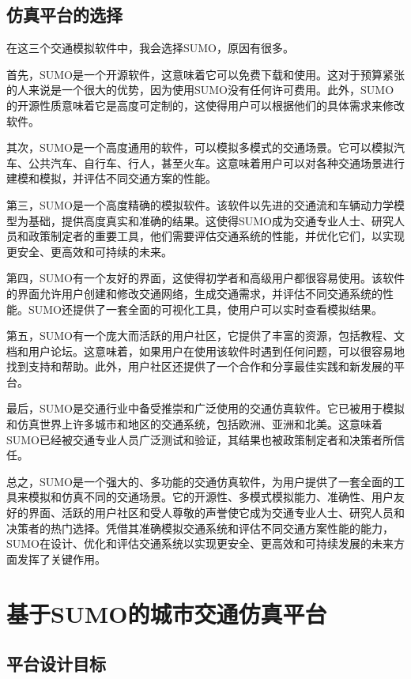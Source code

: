 \subsection{仿真平台的选择}

在这三个交通模拟软件中，我会选择SUMO，原因有很多。

首先，SUMO是一个开源软件，这意味着它可以免费下载和使用。这对于预算紧张的人来说是一个很大的优势，因为使用SUMO没有任何许可费用。此外，SUMO的开源性质意味着它是高度可定制的，这使得用户可以根据他们的具体需求来修改软件。

其次，SUMO是一个高度通用的软件，可以模拟多模式的交通场景。它可以模拟汽车、公共汽车、自行车、行人，甚至火车。这意味着用户可以对各种交通场景进行建模和模拟，并评估不同交通方案的性能。

第三，SUMO是一个高度精确的模拟软件。该软件以先进的交通流和车辆动力学模型为基础，提供高度真实和准确的结果。这使得SUMO成为交通专业人士、研究人员和政策制定者的重要工具，他们需要评估交通系统的性能，并优化它们，以实现更安全、更高效和可持续的未来。

第四，SUMO有一个友好的界面，这使得初学者和高级用户都很容易使用。该软件的界面允许用户创建和修改交通网络，生成交通需求，并评估不同交通系统的性能。SUMO还提供了一套全面的可视化工具，使用户可以实时查看模拟结果。

第五，SUMO有一个庞大而活跃的用户社区，它提供了丰富的资源，包括教程、文档和用户论坛。这意味着，如果用户在使用该软件时遇到任何问题，可以很容易地找到支持和帮助。此外，用户社区还提供了一个合作和分享最佳实践和新发展的平台。

最后，SUMO是交通行业中备受推崇和广泛使用的交通仿真软件。它已被用于模拟和仿真世界上许多城市和地区的交通系统，包括欧洲、亚洲和北美。这意味着SUMO已经被交通专业人员广泛测试和验证，其结果也被政策制定者和决策者所信任。

总之，SUMO是一个强大的、多功能的交通仿真软件，为用户提供了一套全面的工具来模拟和仿真不同的交通场景。它的开源性、多模式模拟能力、准确性、用户友好的界面、活跃的用户社区和受人尊敬的声誉使它成为交通专业人士、研究人员和决策者的热门选择。凭借其准确模拟交通系统和评估不同交通方案性能的能力，SUMO在设计、优化和评估交通系统以实现更安全、更高效和可持续发展的未来方面发挥了关键作用。

\section{基于SUMO的城市交通仿真平台}

\subsection{平台设计目标}
 

